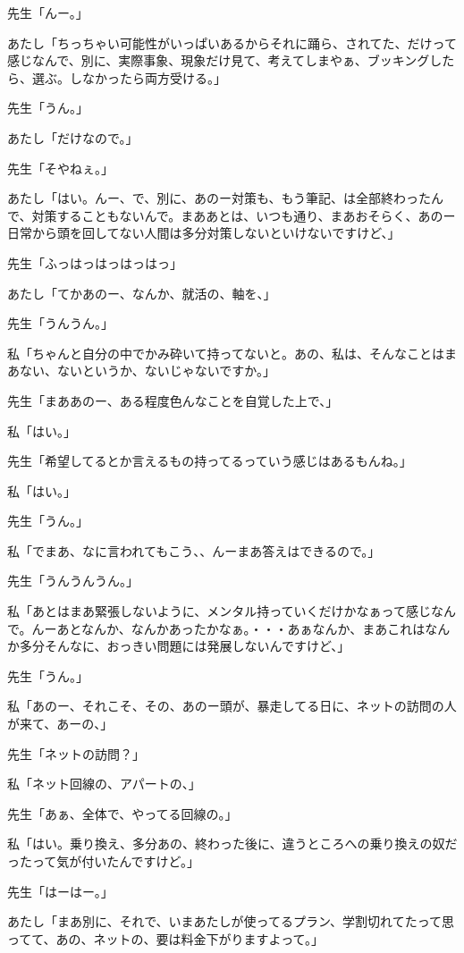 \documentclass[b5j,twoside,twocolumn]{utarticle}
\begin{document}
\begin{description}
\item 先生「んー。」
\item あたし「ちっちゃい可能性がいっぱいあるからそれに踊ら、されてた、だけって感じなんで、別に、実際事象、現象だけ見て、考えてしまやぁ、ブッキングしたら、選ぶ。しなかったら両方受ける。」
\item 先生「うん。」
\item あたし「だけなので。」
\item 先生「そやねぇ。」
\item あたし「はい。んー、で、別に、あのー対策も、もう筆記、は全部終わったんで、対策することもないんで。まああとは、いつも通り、まあおそらく、あのー日常から頭を回してない人間は多分対策しないといけないですけど、」
\item 先生「ふっはっはっはっはっ」
\item あたし「てかあのー、なんか、就活の、軸を、」
\item 先生「うんうん。」
\item 私「ちゃんと自分の中でかみ砕いて持ってないと。あの、私は、そんなことはまあない、ないというか、ないじゃないですか。」
\item 先生「まああのー、ある程度色んなことを自覚した上で、」
\item 私「はい。」
\item 先生「希望してるとか言えるもの持ってるっていう感じはあるもんね。」
\item 私「はい。」
\item 先生「うん。」
\item 私「でまあ、なに言われてもこう、、んーまあ答えはできるので。」
\item 先生「うんうんうん。」
\item 私「あとはまあ緊張しないように、メンタル持っていくだけかなぁって感じなんで。んーあとなんか、なんかあったかなぁ。・・・あぁなんか、まあこれはなんか多分そんなに、おっきい問題には発展しないんですけど、」
\item 先生「うん。」
\item 私「あのー、それこそ、その、あのー頭が、暴走してる日に、ネットの訪問の人が来て、あーの、」
\item 先生「ネットの訪問？」
\item 私「ネット回線の、アパートの、」
\item 先生「あぁ、全体で、やってる回線の。」
\item 私「はい。乗り換え、多分あの、終わった後に、違うところへの乗り換えの奴だったって気が付いたんですけど。」
\item 先生「はーはー。」
\item あたし「まあ別に、それで、いまあたしが使ってるプラン、学割切れてたって思ってて、あの、ネットの、要は料金下がりますよって。」

\end{description}
\end{document}
